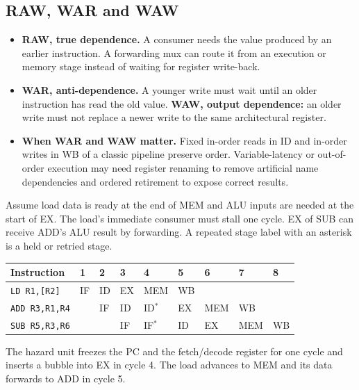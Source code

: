 \documentclass[12pt,a4paper]{article}
\begin{document}
\subsection{RAW, WAR and WAW}
\begin{itemize}[leftmargin=*,itemsep=3pt]
\item \textbf{RAW, true dependence.} A consumer needs the value produced by an earlier instruction. A forwarding mux can route it from an execution or memory stage instead of waiting for register write-back.
\item \textbf{WAR, anti-dependence.} A younger write must wait until an older instruction has read the old value. \textbf{WAW, output dependence:} an older write must not replace a newer write to the same architectural register.
\item \textbf{When WAR and WAW matter.} Fixed in-order reads in ID and in-order writes in WB of a classic pipeline preserve order. Variable-latency or out-of-order execution may need register renaming to remove artificial name dependencies and ordered retirement to expose correct results.
\end{itemize}
\begin{tcolorbox}[examplebox,title={Load-use hazard with forwarding}]
Assume load data is ready at the end of MEM and ALU inputs are needed at the start of EX. The load's immediate consumer must stall one cycle. EX of SUB can receive ADD's ALU result by forwarding. A repeated stage label with an asterisk is a held or retried stage.
\par\vspace{6pt}\noindent
\begin{tabularx}{\linewidth}{|B{3.0cm}|*{8}{>{\centering\arraybackslash\small}X|}}\hline
Instruction & 1 & 2 & 3 & 4 & 5 & 6 & 7 & 8 \\ \hline
\texttt{LD R1,[R2]} & IF & ID & EX & MEM & WB & & & \\ \hline
\texttt{ADD R3,R1,R4} & & IF & ID & ID$^*$ & EX & MEM & WB & \\ \hline
\texttt{SUB R5,R3,R6} & & & IF & IF$^*$ & ID & EX & MEM & WB \\ \hline
\end{tabularx}

The hazard unit freezes the PC and the fetch/decode register for one cycle and inserts a bubble into EX in cycle 4. The load advances to MEM and its data forwards to ADD in cycle 5.
\end{tcolorbox}
\end{document}
